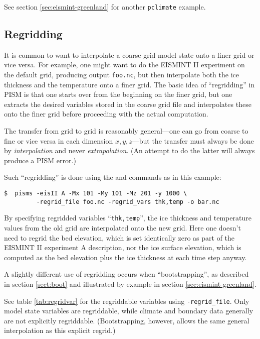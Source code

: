See section \ref{sec:eismint-greenland} for another \texttt{pclimate} example.

\subsection{Regridding}
\label{sec:regridding}

It is common to want to interpolate a coarse grid model state onto a finer grid or vice versa.  For example, one might want to do the EISMINT II experiment on the default grid, producing output \texttt{foo.nc}, but then interpolate both the ice thickness and the temperature onto a finer grid.  The basic idea of ``regridding'' in PISM is that one starts over from the beginning on the finer grid, but one extracts the desired variables stored in the coarse grid file and interpolates these onto the finer grid before proceeding with the actual computation.

The transfer from grid to grid is reasonably general---one can go from coarse to fine or vice versa in each dimension $x,y,z$---but the transfer must always be done by \emph{interpolation} and never \emph{extrapolation}.  (An attempt to do the latter will always produce a PISM error.)

Such ``regridding'' is done using the  and
 commands as in this example: 

\begin{verbatim}
$  pisms -eisII A -Mx 101 -My 101 -Mz 201 -y 1000 \
         -regrid_file foo.nc -regrid_vars thk,temp -o bar.nc
\end{verbatim}
\noindent By specifying regridded variables ``\texttt{thk,temp}'', the ice thickness and temperature values from the old grid are interpolated onto the new grid.  Here one doesn't need to regrid the bed elevation, which is set identically zero as part of the EISMINT II experiment A description, nor the ice surface elevation, which is computed as the bed elevation plus the ice thickness at each time step anyway.

A slightly different use of regridding occurs when ``bootstrapping'', as described in section \ref{sect:boot} and illustrated by example in section \ref{sec:eismint-greenland}.

See table \ref{tab:regridvar} for the regriddable variables using
\texttt{-regrid_file}.  Only model state variables are regriddable, while climate and boundary data generally are not explicitly regriddable.  (Bootstrapping, however, allows the same general interpolation as this explicit regrid.)

